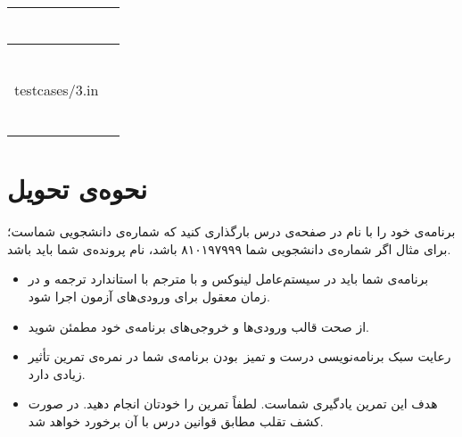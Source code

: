 \documentclass{utap}
\begin{document}
\begin{table}[H]
\begin{tabular}{|c|c|}
\begin{latin}
\begin{minipage}[]{0.3\textwidth}
\begin{verbatim}
            \end{verbatim}
            \end{minipage}\end{latin}
            \\
            \hline
            \begin{latin}\begin{minipage}[]{0.3\textwidth}\footnotesize
            {\begin{lstinputlisting}[numbers=left,language=zabanche,basicstyle=\footnotesize\ttfamily\color{Gray}]{testcases/3.in}
            \end{lstinputlisting}}
            \end{minipage}\end{latin}
            &
            \begin{latin}\begin{minipage}[]{0.3\textwidth}\footnotesize
            
            \begin{verbatim}





            \end{verbatim}
            \end{minipage}\end{latin}
            \\
            \hline
        \end{tabular}
    \end{table}
    
    \section{نحوه‌ی تحویل}

    برنامه‌ی خود را با نام  در صفحه‌ی  درس بارگذاری کنید که  شماره‌ی دانشجویی شماست؛ برای مثال اگر شماره‌ی دانشجویی شما ۸۱۰۱۹۷۹۹۹ باشد، نام پرونده‌ی شما باید  باشد.

    \begin{itemize}
        \item برنامه‌ی شما باید در سیستم‌عامل لینوکس و با مترجم  با استاندارد  ترجمه و در زمان معقول برای ورودی‌های آزمون اجرا شود.
        \item از صحت قالب ورودی‌ها و خروجی‌های برنامه‌ی خود مطمئن شوید.
        \item رعایت سبک برنامه‌نویسی درست و تمیز~بودن برنامه‌ی شما در نمره‌ی تمرین تأثیر زیادی دارد.
        \item هدف این تمرین یادگیری شماست. لطفاً تمرین را خودتان انجام دهید. در صورت کشف تقلب مطابق قوانین درس با آن برخورد خواهد شد.
    \end{itemize}
\end{document}
